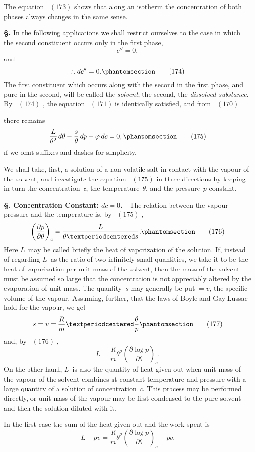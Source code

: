 \documentclass[12pt]{book}[2005/09/16]
\newcommand{\Typo}[2]{#2}
\newcommand{\Chg}[2]{#2}
\newcommand{\Add}[1]{\Chg{}{#1}}
\newcommand{\Section}[1]{
  \medskip\par\textbf{§\;#1}
  \label{section:#1}
}
\newcommand{\Tag}[1]{%
  \phantomsection\label{eqn:#1}\tag*{\ensuremath{#1}}%
}
\newcommand{\Eq}[1]{%
  \hyperref[eqn:#1]{\ensuremath{#1}}%
}
\newcommand{\PageSep}[1]{\ignorespaces}
\newcommand{\Topic}[1]{\textbf{#1}}
\newcommand{\dd}{\partial}
\begin{document}
The equation~\Eq{(173)} shows that along an isotherm the
concentration of both phases always changes in the same
sense.

\Section{220.} In the following applications we shall restrict
ourselves to the case in which the second constituent occurs
only in the first phase,
\[
c'' = 0,
\]
and
\[
\therefore
dc'' = 0\Add{.}
\Tag{(174)}
\]
The first constituent which occurs along with the second
in the first phase, and pure in the second, will be called
the \emph{solvent}; the second, the \emph{dissolved substance}. By~\Eq{(174)},
%
the equation~\Eq{(171)} is identically satisfied, and from~\Eq{(170)}
there remains
\[
\frac{L}{\theta^{2}}\, d\theta - \frac{s}{\theta}\, dp - \varphi\, dc = 0,
\Tag{(175)}
\]
if we omit suffixes and dashes for simplicity.

We shall take, first, a solution of a \Chg{nonvolatile}{non-volatile} salt in
contact with the vapour of the solvent, and investigate the
equation~\Eq{(175)} in three directions by keeping in turn the
concentration~$c$, the temperature~$\theta$, and the pressure~$p$
constant.
\PageSep{197}

\Section{221.} \Topic{Concentration Constant: $dc = 0$.}---The relation
%
between the vapour pressure and the temperature is, by~\Eq{(175)},
\[
\left(\frac{\dd p}{\dd \theta}\right)_{c} = \frac{L}{\theta · s}.
\Tag{(176)}
\]
Here $L$~may be called briefly the heat of vaporization
of the solution. If, instead of regarding $L$~as the ratio of
two infinitely small quantities, we take it to be the heat of
vaporization per unit mass of the solvent, then the mass
of the solvent must be assumed so large that the concentration
is not appreciably altered by the evaporation of
unit mass. The quantity~$s$ may generally be put $= v$, the
specific volume of the vapour. Assuming, further, that the
laws of Boyle and \Typo{Gay Lussac}{Gay-Lussac} hold for the vapour, we get
\[
s = v = \frac{R}{m} · \frac{\theta}{p}
\Tag{(177)}
\]
and, by~\Eq{(176)},
\[
L = \frac{R}{m} \theta^{2} \left(\frac{\dd \log p}{\dd \theta}\right)_{c}.
\]
On the other hand, $L$~is also the quantity of heat given
out when unit mass of the vapour of the solvent combines
at constant temperature and pressure with a large quantity
of a solution of concentration~$c$. This process may be performed
directly, or unit mass of the vapour may be first
condensed to the pure solvent and then the solution diluted
with it.

In the first case the sum of the heat given out and the
work spent is
\[
L - pv = \frac{R}{m} \theta^{2} \left(\frac{\dd \log p}{\dd \theta}\right)_{c} - pv.
\]
\end{document}
